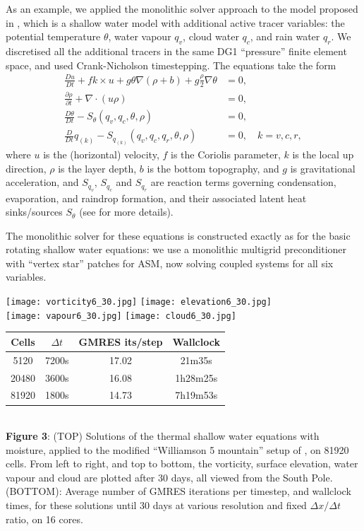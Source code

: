 \documentclass[
]{ImperialPoster}
\newcommand{\pp}[2]{\frac{\partial #1}{\partial #2}}
\newcommand{\DD}[2]{\frac{D #1}{D #2}}
\begin{document}
\begin{multicols}{3}
As an example, we applied the monolithic solver approach
to the model proposed in \cite{zerroukat2015moist}, which is a shallow
water model with additional active tracer variables: the potential
temperature $\theta$, water vapour $q_v$, cloud water $q_c$, and rain
water $q_r$. We discretised all the additional tracers in the same DG1
``pressure'' finite element space, and used Crank-Nicholson timestepping.
The equations take the form
\begin{align*}
  \DD{u}{t} + fk\times u + g\theta \nabla (\rho+b) + g\frac{\rho}{2}\nabla \theta
  & = 0, \\
  \pp{\rho}{t} + \nabla\cdot(u\rho) & = 0, \\
  \DD{\theta}{t} - S_\theta(q_v, q_c, \theta, \rho) & = 0, \\
  \DD{}{t}q_{(k)} - S_{q_{(k)}}(q_v, q_c, q_r, \theta, \rho) & = 0, \quad
  k=v,c,r,
\end{align*}
where $u$ is the (horizontal) velocity, $f$ is the Coriolis parameter,
$k$ is the local up direction, $\rho$ is the layer depth, $b$ is the
bottom topography, and $g$ is gravitational acceleration,
and $S_{q_v}$, $S_{q_c}$ and $S_{q_r}$ are reaction terms governing
condensation, evaporation, and raindrop formation, and their associated
latent heat sinks/sources $S_\theta$ (see \cite{zerroukat2015moist}
for more details).

The monolithic solver for these equations is constructed exactly as for
the basic rotating shallow water equations: we use a monolithic multigrid
preconditioner with ``vertex star'' patches for ASM, now solving coupled
systems for all six variables. 

\begin{center}
  \texttt{[image: vorticity6\_30.jpg]}
  \texttt{[image: elevation6\_30.jpg]}\\
  \texttt{[image: vapour6\_30.jpg]}
  \texttt{[image: cloud6\_30.jpg]}\\
  \begin{tabular}{cccc}
    Cells & $\Delta t$ & GMRES its/step & Wallclock \\
    \hline
    5120 & 7200s & 17.02 & 21m35s \\
    20480 & 3600s & 16.08 & 1h28m25s \\
    81920 & 1800s & 14.73 & 7h19m53s \\
  \end{tabular} \\
    \vspace{3mm} {\bfseries Figure 3}: (TOP) Solutions of the thermal
    shallow water equations with moisture, applied to the modified
    ``Williamson 5 mountain'' setup of \cite{zerroukat2015moist}, on
    81920 cells. From left to right, and top to bottom,
    the vorticity, surface elevation, water vapour and cloud are
    plotted after 30 days, all viewed from the South Pole.  (BOTTOM):
    Average number of GMRES iterations per timestep, and wallclock
    times, for these solutions until 30 days at various resolution and
    fixed $\Delta x/\Delta t$ ratio, on 16 cores.
  \end{center}


\end{multicols}
\end{document}
